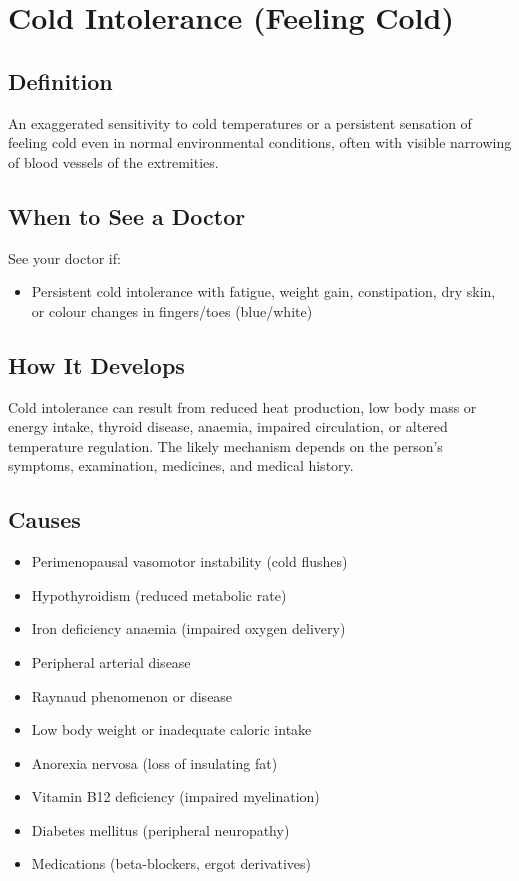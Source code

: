 \chapter{Cold Intolerance (Feeling Cold)}

\section*{Definition}
An exaggerated sensitivity to cold temperatures or a persistent sensation of feeling cold even in normal environmental conditions, often with visible narrowing of blood vessels of the extremities.

\section*{When to See a Doctor}
See your doctor if:
\begin{itemize}
  \item Persistent cold intolerance with fatigue, weight gain, constipation, dry skin, or colour changes in fingers/toes (blue/white)
\end{itemize}

\section*{How It Develops}
Cold intolerance can result from reduced heat production, low body mass or energy intake, thyroid disease, anaemia, impaired circulation, or altered temperature regulation. The likely mechanism depends on the person's symptoms, examination, medicines, and medical history.

\section*{Causes}
\begin{itemize}
  \item Perimenopausal vasomotor instability (cold flushes)
  \item Hypothyroidism (reduced metabolic rate)
  \item Iron deficiency anaemia (impaired oxygen delivery)
  \item Peripheral arterial disease
  \item Raynaud phenomenon or disease
  \item Low body weight or inadequate caloric intake
  \item Anorexia nervosa (loss of insulating fat)
  \item Vitamin B12 deficiency (impaired myelination)
  \item Diabetes mellitus (peripheral neuropathy)
  \item Medications (beta-blockers, ergot derivatives)
\end{itemize}

